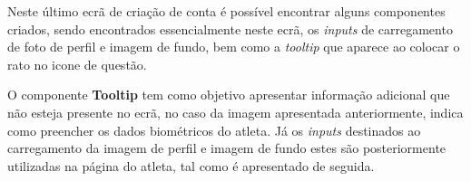 Neste último ecrã de criação de conta é possível encontrar alguns componentes criados, sendo encontrados essencialmente neste ecrã, os \textit{inputs} de carregamento de foto de perfil e imagem de fundo, bem como a \textit{tooltip} que aparece ao colocar o rato no icone de questão.

\begin{minipage}{0.45\textwidth}
\end{minipage}
\begin{minipage}{0.45\textwidth}
\end{minipage}

O componente \textbf{Tooltip} tem como objetivo apresentar informação adicional que não esteja presente no ecrã, no caso da imagem apresentada anteriormente, indica como preencher os dados biométricos do atleta. Já os \textit{inputs} destinados ao carregamento da imagem de perfil e imagem de fundo estes são posteriormente utilizadas na página do atleta, tal como é apresentado de seguida.

